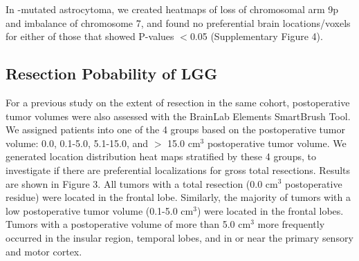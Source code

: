 In -mutated astrocytoma, we created heatmaps of loss of chromosomal arm 9p and imbalance of chromosome 7, and found no preferential brain locations/voxels for either of those that showed P-values $<$0.05 (Supplementary Figure 4).

\subsection{Resection Pobability of LGG}
For a previous study on the extent of resection in the same cohort, postoperative tumor volumes were also assessed with the BrainLab Elements SmartBrush Tool.
We assigned patients into one of the 4 groups based on the postoperative tumor volume: 0.0, 0.1-5.0, 5.1-15.0, and $>$ 15.0 cm$^3$ postoperative tumor volume.
We generated location distribution heat maps stratified by these 4 groups, to investigate if there are preferential localizations for gross total resections.
Results are shown in Figure 3.
All tumors with a total resection (0.0 cm$^3$ postoperative residue) were located in the frontal lobe.
Similarly, the majority of tumors with a low postoperative tumor volume (0.1-5.0 cm$^3$) were located in the frontal lobes.
Tumors with a postoperative volume of more than 5.0 cm$^3$ more frequently occurred in the insular region, temporal lobes, and in or near the primary sensory and motor cortex.

